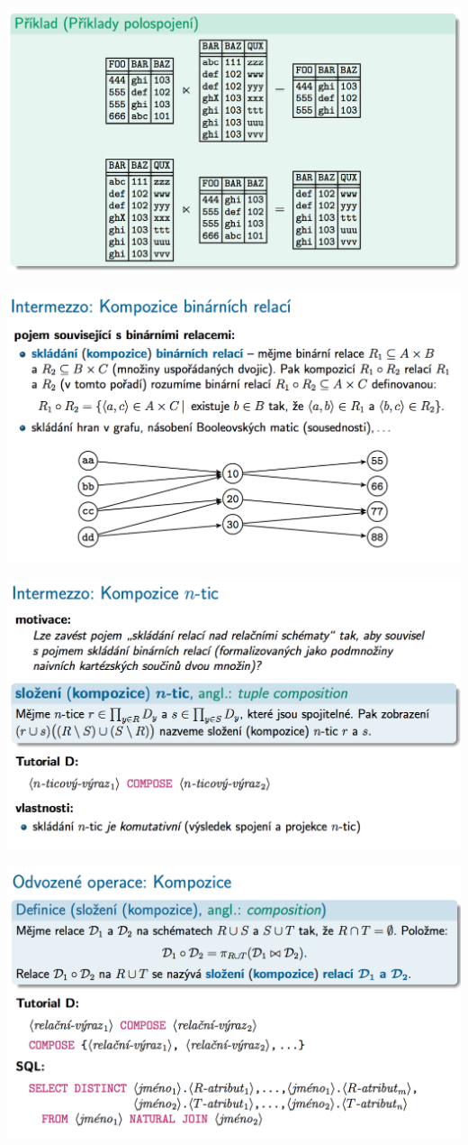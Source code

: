 \documentclass[10pt,a4paper]{article}
\begin{document}
	\includegraphics[scale=0.4]{img/47}
	
	\includegraphics[scale=0.4]{img/48}
	
	\includegraphics[scale=0.4]{img/49}
	
	\includegraphics[scale=0.4]{img/50}
	
\end{document}
